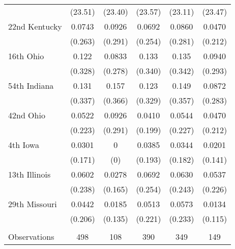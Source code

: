 \begin{tabular}{lccccc}
 & (23.51) & (23.40) & (23.57) & (23.11) & (23.47) \\
22nd Kentucky & 0.0743 & 0.0926 & 0.0692 & 0.0860 & 0.0470 \\
 & (0.263) & (0.291) & (0.254) & (0.281) & (0.212) \\
16th Ohio & 0.122 & 0.0833 & 0.133 & 0.135 & 0.0940 \\
 & (0.328) & (0.278) & (0.340) & (0.342) & (0.293) \\
54th Indiana & 0.131 & 0.157 & 0.123 & 0.149 & 0.0872 \\
 & (0.337) & (0.366) & (0.329) & (0.357) & (0.283) \\
42nd Ohio & 0.0522 & 0.0926 & 0.0410 & 0.0544 & 0.0470 \\
 & (0.223) & (0.291) & (0.199) & (0.227) & (0.212) \\
4th Iowa & 0.0301 & 0 & 0.0385 & 0.0344 & 0.0201 \\
 & (0.171) & (0) & (0.193) & (0.182) & (0.141) \\
13th Illinois & 0.0602 & 0.0278 & 0.0692 & 0.0630 & 0.0537 \\
 & (0.238) & (0.165) & (0.254) & (0.243) & (0.226) \\
29th Missouri & 0.0442 & 0.0185 & 0.0513 & 0.0573 & 0.0134 \\
 & (0.206) & (0.135) & (0.221) & (0.233) & (0.115) \\
 &  &  &  &  &  \\
 Observations & 498 & 108 & 390 & 349 & 149 \\ \hline
\end{tabular}
